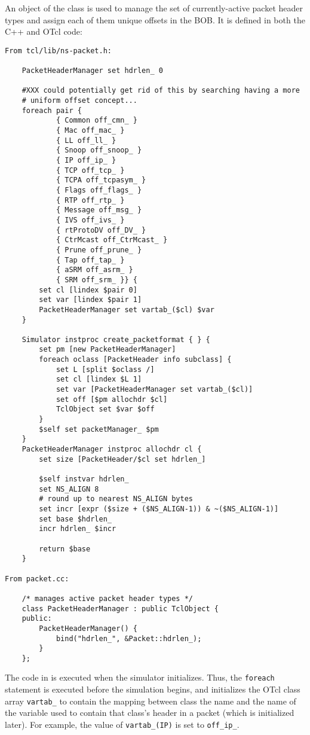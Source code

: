 An object of the class  is used
to manage the set of currently-active packet header types and
assign each of them unique offsets in the BOB.
It is defined in both the C++ and OTcl code:
\begin{small}
\begin{verbatim}
From tcl/lib/ns-packet.h:

	PacketHeaderManager set hdrlen_ 0

	#XXX could potentially get rid of this by searching having a more
	# uniform offset concept...
	foreach pair {
			{ Common off_cmn_ }
			{ Mac off_mac_ }
			{ LL off_ll_ }
			{ Snoop off_snoop_ }
			{ IP off_ip_ }
			{ TCP off_tcp_ }
			{ TCPA off_tcpasym_ }
			{ Flags off_flags_ }
			{ RTP off_rtp_ }
			{ Message off_msg_ }
			{ IVS off_ivs_ }
			{ rtProtoDV off_DV_ }
			{ CtrMcast off_CtrMcast_ }
			{ Prune off_prune_ }
			{ Tap off_tap_ }
			{ aSRM off_asrm_ }
			{ SRM off_srm_ }} {
		set cl [lindex $pair 0]
		set var [lindex $pair 1]
		PacketHeaderManager set vartab_($cl) $var
	}    

	Simulator instproc create_packetformat { } {
		set pm [new PacketHeaderManager]
		foreach oclass [PacketHeader info subclass] {
			set L [split $oclass /]
			set cl [lindex $L 1]
			set var [PacketHeaderManager set vartab_($cl)]
			set off [$pm allochdr $cl]
			TclObject set $var $off
		}       
		$self set packetManager_ $pm
	}    
	PacketHeaderManager instproc allochdr cl {
		set size [PacketHeader/$cl set hdrlen_]
	     
		$self instvar hdrlen_ 
		set NS_ALIGN 8
		# round up to nearest NS_ALIGN bytes
		set incr [expr ($size + ($NS_ALIGN-1)) & ~($NS_ALIGN-1)]
		set base $hdrlen_
		incr hdrlen_ $incr

		return $base
	}

From packet.cc:

	/* manages active packet header types */
	class PacketHeaderManager : public TclObject {
	public:
		PacketHeaderManager() {
			bind("hdrlen_", &Packet::hdrlen_);
		}
	};

\end{verbatim}
\end{small}
The code in  is executed when the
simulator initializes.
Thus, the {\tt foreach} statement is executed before the
simulation begins, and initializes the OTcl class array
{\tt vartab\_} to contain the mapping between class
the name and the name of the variable used to contain
that class's header in a packet (which is initialized later).
For example, the value of {\tt vartab\_(IP)} is set to
{\tt off\_ip\_}.

